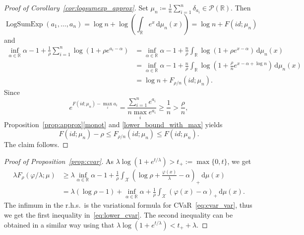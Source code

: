 \documentclass{article}
\newcommand{\dd}{\,\mathrm{d}}
\newcommand{\Pspace}{\mathcal{P}}
\newcommand{\R}{\mathbb{R}}
\newcommand*{\eqset}{\coloneqq}
\def\cX{\mathcal{X}}
\theoremstyle{plain}
\theoremstyle{definition}
\theoremstyle{remark}
\begin{document}
\begin{proof}[Proof of Corollary~\ref{cor:logsumexp_approx}]
    Set $\mu_n \eqset \frac{1}{n} \sum_{i=1}^n \delta_{a_i} \in \Pspace(\R)$. 
    Then
    \[
    \operatorname{LogSumExp}(a_1, \dots, a_n) = \log n + \log\left(\int_{\R} e^x \dd \mu_n(x)\right) = \log n + F(id; \mu_n)
    \]
    and
    \begin{align*}
        \inf_{\alpha \in \R} \alpha - 1 + \frac{1}{\rho} \sum_{i=1}^n \log(1 + \rho e^{a_i - \alpha}) 
        &= \inf_{\alpha \in \R} \alpha - 1 + \frac{n}{\rho} \int_{\R} \log(1 + \rho e^{x - \alpha}) \dd \mu_n(x) \\
        &= \inf_{\alpha \in \R} \alpha - 1 + \frac{n}{\rho} \int_{\R} \log\left(1 + \frac{\rho}{n} e^{x - \alpha + \log n}\right) \dd \mu_n(x) \\
        &= \log n + F_{\rho/n}(id; \mu_n) .
    \end{align*}
    Since
    \[
    e^{F(id; \mu_n) - \max_i a_i} = \frac{\sum_{i=1}^n e^{a_i}}{n \max_i e^{a_i}} \ge \frac{1}{n} > \frac{\rho}{n},
    \]
    Proposition~\ref{prop:approx}\ref{monot} and \ref{lower_bound_with_max} yields
    \[
    F(id; \mu_n) - \rho \le F_{\rho/n}(id; \mu_n) \le F(id; \mu_n) .
    \]
    The claim follows.
\end{proof}

\begin{proof}[Proof of Proposition~\ref{prop:cvar}]
    As $\lambda \log(1 + e^{t/\lambda}) > t_+:=\max\{0,t\}$, we get
    \begin{align*}
        \lambda F_\rho(\varphi / \lambda ; \mu) &\ge \lambda \inf_{\alpha \in \R} \alpha - 1 + \frac{1}{\rho} \int_{ {\cX}} \left(\log \rho + \frac{\varphi(x)}{\lambda} - \alpha\right)_+ \dd \mu(x) \\
        &= \lambda (\log \rho - 1) + \inf_{\alpha \in \R} \alpha + \frac{1}{\rho} \int_{ {\cX}} (\varphi(x) - \alpha)_+ \dd \mu(x) .
    \end{align*}
    The infimum in the r.h.s.\ is the variational formula for CVaR~\eqref{eq:cvar_var}, thus we get the first inequality in~\eqref{eq:lower_cvar}.
    The second inequality can be obtained in a similar way using that $\lambda \log(1 + e^{t/\lambda}) < t_+ + \lambda$.
\end{proof}
\end{document}
